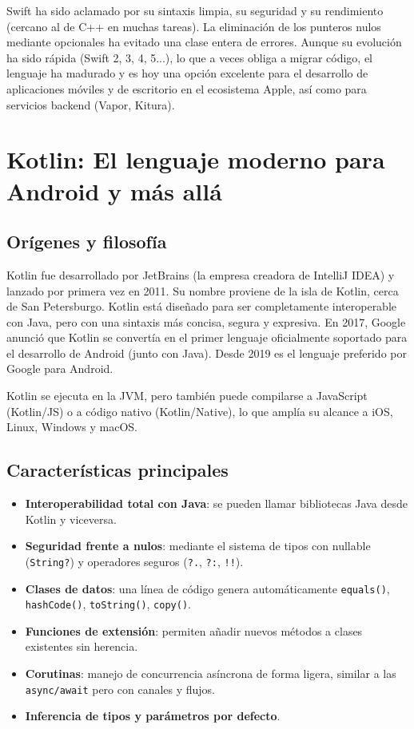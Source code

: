 Swift ha sido aclamado por su sintaxis limpia, su seguridad y su rendimiento (cercano al de C++ en muchas tareas). La eliminación de los punteros nulos mediante opcionales ha evitado una clase entera de errores. Aunque su evolución ha sido rápida (Swift 2, 3, 4, 5...), lo que a veces obliga a migrar código, el lenguaje ha madurado y es hoy una opción excelente para el desarrollo de aplicaciones móviles y de escritorio en el ecosistema Apple, así como para servicios backend (Vapor, Kitura).

\section{Kotlin: El lenguaje moderno para Android y más allá}

\subsection{Orígenes y filosofía}

Kotlin fue desarrollado por JetBrains (la empresa creadora de IntelliJ IDEA) y lanzado por primera vez en 2011. Su nombre proviene de la isla de Kotlin, cerca de San Petersburgo. Kotlin está diseñado para ser completamente interoperable con Java, pero con una sintaxis más concisa, segura y expresiva. En 2017, Google anunció que Kotlin se convertía en el primer lenguaje oficialmente soportado para el desarrollo de Android (junto con Java). Desde 2019 es el lenguaje preferido por Google para Android.

Kotlin se ejecuta en la JVM, pero también puede compilarse a JavaScript (Kotlin/JS) o a código nativo (Kotlin/Native), lo que amplía su alcance a iOS, Linux, Windows y macOS.

\subsection{Características principales}

\begin{itemize}
  \item \textbf{Interoperabilidad total con Java}: se pueden llamar bibliotecas Java desde Kotlin y viceversa.
  \item \textbf{Seguridad frente a nulos}: mediante el sistema de tipos con nullable (\texttt{String?}) y operadores seguros (\texttt{?.}, \texttt{?:}, \texttt{!!}).
  \item \textbf{Clases de datos}: una línea de código genera automáticamente \texttt{equals()}, \texttt{hashCode()}, \texttt{toString()}, \texttt{copy()}.
  \item \textbf{Funciones de extensión}: permiten añadir nuevos métodos a clases existentes sin herencia.
  \item \textbf{Corutinas}: manejo de concurrencia asíncrona de forma ligera, similar a las \texttt{async/await} pero con canales y flujos.
  \item \textbf{Inferencia de tipos y parámetros por defecto}.
\end{itemize}

